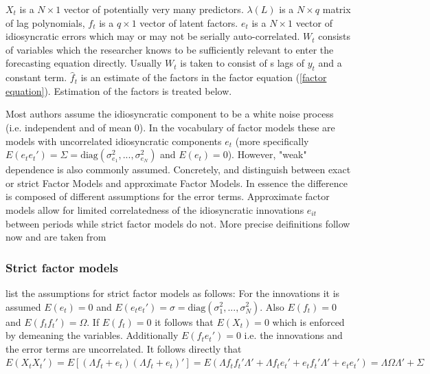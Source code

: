 \documentclass[12pt]{article}
\begin{document}
$X_t$ is a $N \times 1$ vector of potentially very many predictors. $\lambda(L)$ is a $N \times q$ matrix of lag polynomials, $f_t$ is a $q \times 1$ vector of latent factors. $e_t$ is a $N \times 1$ vector of idiosyncratic errors which may or may not be serially auto-correlated. $W_t$ consists of variables which the researcher knows to be sufficiently relevant to enter the forecasting equation directly. Usually $W_t$ is taken to consist of s lags of $y_t$ and a constant term. $\hat f_t$ is an estimate of the factors in the factor equation (\ref{factor equation}). Estimation of the factors is treated below.

Most authors assume the idiosyncratic component to be a white noise process (i.e. independent and of mean 0). In the vocabulary of factor models these are models with uncorrelated idiosyncratic components $e_t$ (more specifically $E(e_t e_t') = \Sigma = \text{diag}(\sigma_{e_1}^2, ..., \sigma_{e_N}^2)$ and $E(e_t) = 0$).
However, "weak" dependence is also commonly assumed. Concretely, \citet{geweke1977dynamic} and \citet{sargent1977business} distinguish between exact or strict Factor Models and approximate Factor Models. In essence the difference is composed of different assumptions for the error terms. Approximate factor models allow for limited correlatedness of the idiosyncratic innovations $e_{it}$ between periods while strict factor models do not. More precise deifinitions follow now and are taken from \citet{breitung2006dynamic}
\subsubsection*{Strict factor models}
\citet{breitung2006dynamic} list the assumptions for strict factor models as follows: For the innovations it is assumed $E(e_t) = 0$ and $E(e_te_t') = \sigma = \text{diag}(\sigma_1^2, ..., \sigma_N^2)$. Also $E(f_t) = 0$ and $E(f_tf_t') = \Omega$. If $E(f_t) = 0$ it follows that $E(X_t) = 0$ which is enforced by demeaning the variables. Additionally $E(f_t e_t') = 0$ i.e. the innovations and the error terms are uncorrelated. It follows directly that $E(X_tX_t') = E[(\Lambda f_t +e_t) (\Lambda f_t + e_t)'] = E(\Lambda f_t f_t' \Lambda' + \Lambda f_t e_t' + e_t f_t' \Lambda' + e_t e_t') = \Lambda \Omega \Lambda' + \Sigma$ 
\end{document}
